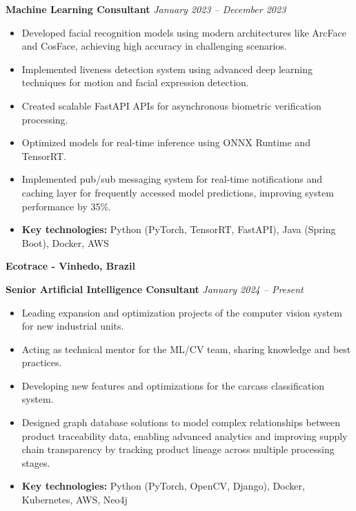 \documentclass[12pt,a4paper,sans]{moderncv}        %
\begin{document}
\vspace{12pt}
\textbf{Machine Learning Consultant} \hfill \textit{January 2023 -- December 2023}
\begin{itemize}
    \item Developed facial recognition models using modern architectures like ArcFace and CosFace, achieving high accuracy in challenging scenarios.
    \item Implemented liveness detection system using advanced deep learning techniques for motion and facial expression detection.
    \item Created scalable FastAPI APIs for asynchronous biometric verification processing.
    \item Optimized models for real-time inference using ONNX Runtime and TensorRT.
    \item Implemented pub/sub messaging system for real-time notifications and caching layer for frequently accessed model predictions, improving system performance by 35\%.
    \item \textbf{Key technologies:} Python (PyTorch, TensorRT, FastAPI), Java (Spring Boot), Docker, AWS
\end{itemize}

\vspace{24pt}
\small{\textbf{Ecotrace - Vinhedo, Brazil}}
\vspace{3pt}

\textbf{Senior Artificial Intelligence Consultant} \hfill \textit{January 2024 -- Present}
\begin{itemize}
    \item Leading expansion and optimization projects of the computer vision system for new industrial units.
    \item Acting as technical mentor for the ML/CV team, sharing knowledge and best practices.
    \item Developing new features and optimizations for the carcass classification system.
    \item Designed graph database solutions to model complex relationships between product traceability data, enabling advanced analytics and improving supply chain transparency by tracking product lineage across multiple processing stages.
    \item \textbf{Key technologies:} Python (PyTorch, OpenCV, Django), Docker, Kubernetes, AWS, Neo4j
\end{itemize}
\end{document}
